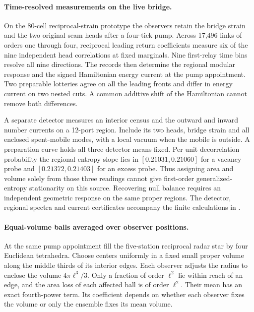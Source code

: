 \documentclass[11pt]{article}
\begin{document}
\paragraph{Time-resolved measurements on the live bridge.}
On the 80-cell reciprocal-strain prototype the observers retain the
bridge strain and the two original seam heads after a four-tick pump.
Across 17,496 links of orders one through four, reciprocal leading
return coefficients measure six of the nine independent head correlations
at fixed marginals. Nine first-relay time bins resolve all nine directions.
The records then determine the regional modular response and the signed
Hamiltonian energy current at the pump appointment.
Two preparable lotteries agree on all the leading fronts and differ
in energy current on two nested cuts. A common additive shift of the
Hamiltonian cannot remove both differences.

A separate detector measures an interior census and the outward and inward
number currents on a 12-port region. Include its two heads, bridge strain
and all enclosed spent-mobile modes, with a local vacuum when the mobile
is outside. A preparation curve holds all three detector means fixed.
Per unit decorrelation probability the regional entropy slope lies in
$[0.21031,0.21060]$ for a vacancy probe and $[0.21372,0.21403]$ for an
excess probe. Thus assigning area and volume solely from those three
readings cannot give first-order generalized-entropy stationarity on
this source. Recovering null balance requires an independent geometric
response on the same proper regions. The detector, regional spectra and
current certificates accompany the finite calculations in
.

\paragraph{Equal-volume balls averaged over observer positions.}
At the same pump appointment fill the five-station reciprocal radar star
by four Euclidean tetrahedra. Choose centers uniformly in a fixed small
proper volume along the middle thirds of its interior edges. Each observer
adjusts the radius to enclose the volume $4\pi\ell^3/3$. Only a fraction
of order $\ell^2$ lie within reach of an edge, and the area loss of each
affected ball is of order $\ell^2$. Their mean has an exact fourth-power
term. Its coefficient depends on whether each observer fixes the volume
or only the ensemble fixes its mean volume.
\end{document}
